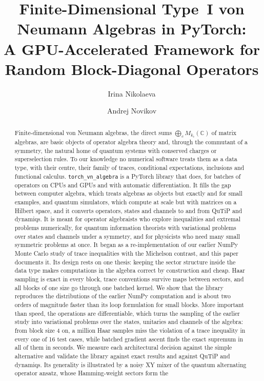 \documentclass[11pt]{article}
\title{Finite-Dimensional Type~I von Neumann Algebras in PyTorch:\\
A GPU-Accelerated Framework for Random Block-Diagonal Operators}
\author{Irina Nikolaeva \and Andrej Novikov}
\date{}
\newcommand{\C}{\mathbb{C}}
\begin{document}
\maketitle

\begin{abstract}
Finite-dimensional von Neumann algebras, the direct sums $\bigoplus_cM_{k_c}(\C)$ of matrix algebras, are basic objects
of operator algebra theory and, through the commutant of a symmetry, the natural home of quantum systems with conserved
charges or superselection rules. To our knowledge no numerical software treats them as a data type, with their centre,
their family of traces, conditional expectations, inclusions and functional calculus. \texttt{torch\_vn\_algebra} is a
PyTorch library that does, for batches of operators on CPUs and GPUs and with automatic differentiation. It fills the
gap between computer algebra, which treats algebras as objects but exactly and for small examples, and quantum
simulators, which compute at scale but with matrices on a Hilbert space, and it converts operators, states and
channels to and from QuTiP and dynamiqs.
It is meant for operator algebraists who explore inequalities and extremal problems numerically, for quantum
information theorists with variational problems over states and channels under a symmetry, and for physicists who need
many small symmetric problems at once. It began as a
re-implementation of our earlier NumPy Monte Carlo study of trace inequalities with the Michelson contrast, and this
paper documents it. Its design rests on one thesis: keeping the sector structure inside the data type makes computations
in the algebra correct by construction and cheap. Haar sampling is exact in every block, trace conventions survive maps
between sectors, and all blocks of one size go through one batched kernel. We show that the library reproduces the
distributions of the earlier NumPy computation and is about two orders of magnitude faster than its loop formulation
for small blocks. More important than speed, the operations are differentiable, which turns the sampling of the earlier
study into variational problems over the states, unitaries and channels of the algebra: from block size 4 on, a million
Haar samples miss the violation of a trace inequality in every one of 16 test cases, while batched gradient ascent
finds the exact supremum in all of them in seconds. We measure each architectural decision against the simple
alternative and validate the library against exact results and against QuTiP and dynamiqs. Its generality is
illustrated by a noisy XY mixer of the quantum alternating operator ansatz, whose Hamming-weight sectors form the

\end{abstract}
\end{document}
